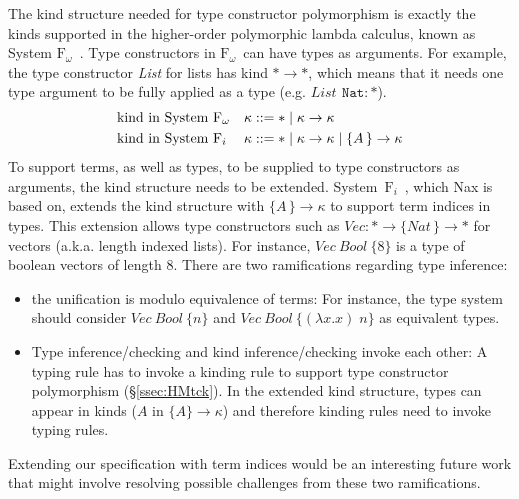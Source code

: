 \documentclass[runningheads,a4paper]{llncs}
\newcommand{\Fw}{\ensuremath{\mathrm{F}_\omega}}
\newcommand{\Fi}{\ensuremath{\mathrm{F}_i}}
\begin{document}
The kind structure needed for type constructor polymorphism is exactly
the kinds supported in the higher-order polymorphic lambda calculus,
known as System \Fw\ \cite{girard72thesis}.
Type constructors in \Fw\ can have types as arguments.
For example, the type constructor \textit{List}
for lists has kind $* \to *$, which means that it needs one type argument
to be fully applied as a type (e.g. $\textit{List}\,~\texttt{Nat} : *$).
\begin{align*}
  &\text{kind in System \Fw}  &&\kappa ::= * \mid \kappa \to \kappa \\
  &\text{kind in System \Fi}  &&\kappa ::= * \mid \kappa \to \kappa
                                             \mid \{A\,\}\to \kappa
\end{align*}
To support terms, as well as types, to be supplied to type constructors
as arguments, the kind structure needs to be extended.
System~\Fi\ \cite{AhnSheFioPit13}, which Nax is based on, extends
the kind structure with $\{A\,\}\to \kappa$ to support term indices in types.
This extension allows type constructors 
such as $\textit{Vec} : * \to \{\textit{Nat}\,\} \to *$ for vectors
(a.k.a. length indexed lists). For instance,
$\textit{Vec}~\textit{Bool}~\{8\}$ is a type of boolean vectors of length 8.
There are two ramifications regarding type inference:
\begin{itemize}\vspace*{-.75ex}
\item the unification is modulo equivalence of terms: For instance,
  the type system should consider $\textit{Vec}~\textit{Bool}~\{n\}$ and
  $\textit{Vec}~\textit{Bool}~\{(\lambda x.x)\;n\}$ as equivalent types.
  \vspace*{.5ex}
\item Type inference/checking and kind inference/checking invoke each other:
  A typing rule has to invoke a kinding rule to support
  type constructor polymorphism  (\S\ref{ssec:HMtck}).
  In the extended kind structure, types can appear in kinds
  ($A$ in $\{\!A\}\to\kappa$) and therefore kinding rules
  need to invoke typing rules.
\end{itemize}
Extending our specification with term indices would be
an interesting future work that might involve resolving possible challenges
from these two ramifications.


\end{document}
